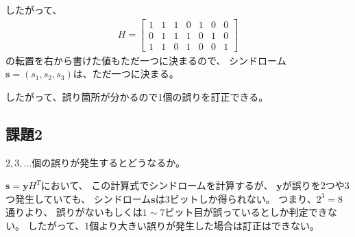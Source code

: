 \documentclass[12pt]{jarticle}
\begin{document}
したがって、
\begin{eqnarray*}
    H = \left[
        \begin{array}{rrrrrrr}
            1 & 1 & 1 & 0 & 1 & 0 & 0 \\
            0 & 1 & 1 & 1 & 0 & 1 & 0 \\
            1 & 1 & 0 & 1 & 0 & 0 & 1
        \end{array}
        \right]
\end{eqnarray*}
の転置を右から書けた値もただ一つに決まるので、
シンドローム$\boldsymbol{s}=(s_1,s_2,s_3)$は、ただ一つに決まる。

したがって、誤り箇所が分かるので1個の誤りを訂正できる。

\subsection{課題2}
\begin{shadebox}
    $2,3,...$個の誤りが発生するとどうなるか。
\end{shadebox}

$\boldsymbol{s}=\boldsymbol{y} H^T$において、
この計算式でシンドロームを計算するが、
$\boldsymbol{y}$が誤りを2つや3つ発生していても、
シンドローム$\boldsymbol{s}$は3ビットしか得られない。
つまり、$2^3=8$通りより、
誤りがないもしくは$1\sim 7$ビット目が誤っているとしか判定できない。
したがって、1個より大きい誤りが発生した場合は訂正はできない。

\clearpage
\appendix
\end{document}
